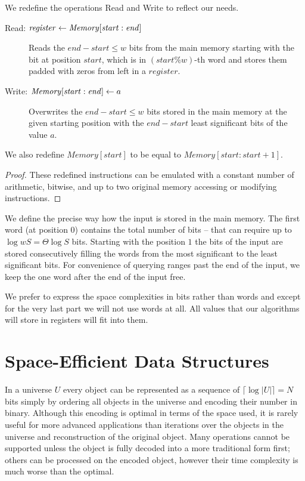 \begin{lemma}
	We redefine the operations Read and Write to reflect our needs.
	
	\begin{description}
		\item[Read: $\mathit{register} \gets \mathit{Memory}[\mathit{start}:\mathit{end}\char93$]
		Reads the $\mathit{end} - \mathit{start} \le w$ bits from the main memory starting with the bit at position $\mathit{start}$, which is in $(\mathit{start} \% w)$-th word and stores them padded with zeros from left in a $register$.
		\item[Write: $\mathit{Memory}[\mathit{start}:\mathit{end}\char93 \gets a$]
		Overwrites the $\mathit{end} - \mathit{start} \le w$ bits stored in the main memory at the given starting position with the $\mathit{end} - \mathit{start}$ least significant bits of the value $a$.
	\end{description}
	
	We also redefine $\mathit{Memory}[\mathit{start}]$ to be equal to $\mathit{Memory}[\mathit{start}:\mathit{start} + 1]$.
\end{lemma}
\begin{proof}
	These redefined instructions can be emulated with a constant number of arithmetic, bitwise, and up to two original memory accessing or modifying instructions.
\end{proof}

We define the precise way how the input is stored in the main memory.
The first word (at position $0$) contains the total number of bits -- that can require up to $\log w S = \Theta \log S$ bits.
Starting with the position $1$ the bits of the input are stored consecutively filling the words from the most significant to the least significant bits.
For convenience of querying ranges past the end of the input, we keep the one word after the end of the input free.

We prefer to express the space complexities in bits rather than words and except for the very last part we will not use words at all.
All values that our algorithms will store in registers will fit into them.

\section{Space-Efficient Data Structures}

In a universe $U$ every object can be represented as a sequence of $\lceil \log |U| \rceil = N$ bits simply by ordering all objects in the universe and encoding their number in binary.
Although this encoding is optimal in terms of the space used, it is rarely useful for more advanced applications than iterations over the objects in the universe and reconstruction of the original object.
Many operations cannot be supported unless the object is fully decoded into a more traditional form first; others can be processed on the encoded object, however their time complexity is much worse than the optimal.

